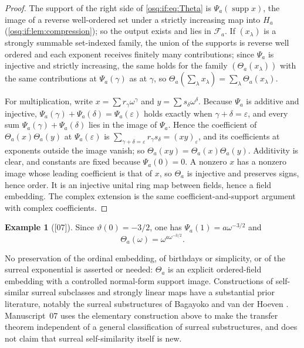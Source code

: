 \documentclass[11pt,letterpaper]{article}
\numberwithin{equation}{section}
\theoremstyle{definition}
\newtheorem{example}[example]{Example}
\theoremstyle{remark}
\theoremstyle{plain}
\newcommand{\FF}{\mathscr F}         %
\newcommand{\supp}{\operatorname{supp}}
\newcommand{\src}[1]{\textup{\textsf{[#1]}}}
\begin{document}
\begin{proof}
The support of the right side of \eqref{osq:if:eq:Theta} is $\Psi_a(\supp x)$, the image of
a reverse well-ordered set under a strictly increasing map into $H_a$
(\cref{osq:if:lem:compression}); so the output exists and lies in $\FF_a$. If
$(x_\lambda)$ is a strongly summable set-indexed family, the union of the supports is
reverse well ordered and each exponent receives finitely many contributions; since
$\Psi_a$ is injective and strictly increasing, the same holds for the family
$(\Theta_a(x_\lambda))$ with the same contributions at $\Psi_a(\gamma)$ as at $\gamma$,
so $\Theta_a(\sum_\lambda x_\lambda)=\sum_\lambda\Theta_a(x_\lambda)$.

For multiplication, write $x=\sum r_\gamma\omega^\gamma$ and $y=\sum s_\delta\omega^\delta$.
Because $\Psi_a$ is additive and injective,
$\Psi_a(\gamma)+\Psi_a(\delta)=\Psi_a(\varepsilon)$ holds exactly when
$\gamma+\delta=\varepsilon$, and every sum $\Psi_a(\gamma)+\Psi_a(\delta)$ lies in the image
of $\Psi_a$. Hence the coefficient of $\Theta_a(x)\Theta_a(y)$ at $\Psi_a(\varepsilon)$ is
$\sum_{\gamma+\delta=\varepsilon}r_\gamma s_\delta=(xy)_\varepsilon$, and its coefficients
at exponents outside the image vanish; so $\Theta_a(xy)=\Theta_a(x)\Theta_a(y)$.
Additivity is clear, and constants are fixed because $\Psi_a(0)=0$. A nonzero $x$ has a
nonzero image whose leading coefficient is that of $x$, so $\Theta_a$ is injective and
preserves signs, hence order. It is an injective unital ring map between fields, hence a
field embedding. The complex extension is the same coefficient-and-support argument with
complex coefficients.
\end{proof}

\begin{example}[\src{07}]\label{osq:if:ex:Theta}
Since $\vartheta(0)=-3/2$, one has $\Psi_a(1)=a\omega^{-3/2}$ and
\[
 \Theta_a(\omega)=\omega^{a\omega^{-3/2}} .
\]
\end{example}

No preservation of the ordinal embedding, of birthdays or simplicity, or of the surreal
exponential is asserted or needed: $\Theta_a$ is an explicit ordered-field embedding with a
controlled normal-form support image. Constructions of self-similar surreal subclasses and
strongly linear maps have a substantial prior literature, notably the surreal
substructures of Bagayoko and van der Hoeven \cite{BagayokoHoeven}. Manuscript~07 uses the
elementary construction above to make the transfer theorem independent of a general
classification of surreal substructures, and does not claim that surreal self-similarity
itself is new.
\end{document}
